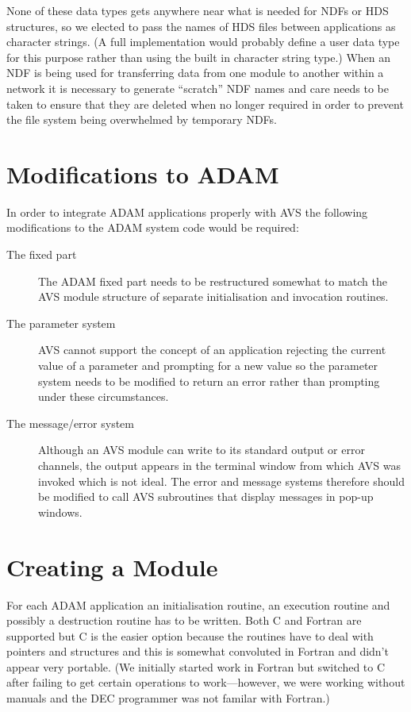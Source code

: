 None of these data types gets anywhere near what is needed for NDFs or HDS
structures, so we elected to pass the names of HDS files between applications
as character strings. (A full implementation would probably define a user data
type for this purpose rather than using the built in character string type.)
When an NDF is being used for transferring data from one module to another
within a network it is necessary to generate ``scratch'' NDF names and care
needs to be taken to ensure that they are deleted when no longer required in
order to prevent the file system being overwhelmed by temporary NDFs.

\section{Modifications to ADAM}

In order to integrate ADAM applications properly with AVS the following
modifications to the ADAM system code would be required:
\begin{description}

\item[The fixed part]
The ADAM fixed part needs to be restructured somewhat to match the AVS module
structure of separate initialisation and invocation routines.

\item[The parameter system]
AVS cannot support the concept of an application rejecting the current value of
a parameter and prompting for a new value so the parameter system needs to be
modified to return an error rather than prompting under these circumstances.

\item[The message/error system]
Although an AVS module can write to its standard output or error channels, the
output appears in the terminal window from which AVS was invoked which is not
ideal. The error and message systems therefore should be modified to call
AVS subroutines that display messages in pop-up windows.

\end{description}

\section{Creating a Module}

For each ADAM application an initialisation routine, an execution routine and
possibly a destruction routine has to be written. Both C and Fortran are
supported but C is the easier option because the routines have to deal with
pointers and structures and this is somewhat convoluted in Fortran and didn't
appear very portable. (We initially started work in Fortran but switched to C
after failing to get certain operations to work---however, we were working
without manuals and the DEC programmer was not familar with Fortran.)

